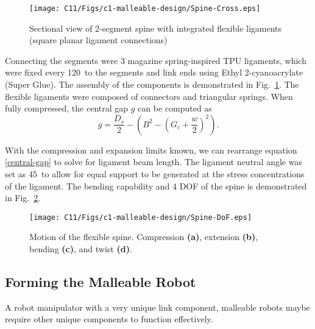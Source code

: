\begin{figure}[!t]
    \centering
    \texttt{[image: C11/Figs/c1-malleable-design/Spine-Cross.eps]}
    \caption{Sectional view of 2-segment spine with integrated flexible ligaments (square planar ligament connections)}
    \label{SpineCross}
\end{figure}

Connecting the segments were 3 magazine spring-inspired TPU ligaments, which were fixed every 120\textdegree\ to the segments and link ends using Ethyl 2-cyanoacrylate (Super Glue). The assembly of the components is demonstrated in Fig.~\ref{SpineCross}. The flexible ligaments were composed of connectors and triangular springs. When fully compressed, the central gap $g$ can be computed as
\begin{equation}
    \label{central-gap}
    g = \frac{D_s}{2}-(B^2-(G_c+\frac{w}{2})^2).
\end{equation}

With the compression and expansion limits known, we can rearrange equation \eqref{central-gap} to solve for ligament beam length. The ligament neutral angle was set as 45\textdegree\ to allow for equal support to be generated at the stress concentrations of the ligament. The bending capability and 4 DOF of the spine is demonstrated in Fig.~\ref{SpineDOF}.

\begin{figure}[t!]
    \centering
    \texttt{[image: C11/Figs/c1-malleable-design/Spine-DoF.eps]}
    \caption{Motion of the flexible spine. Compression {\bf (a)}, extension {\bf (b)}, bending {\bf (c)}, and twist {\bf (d)}.}
    \label{SpineDOF}
\end{figure}

\subsection{Forming the Malleable Robot}
A robot manipulator with a very unique link component, malleable robots maybe require other unique components to function effectively. 

